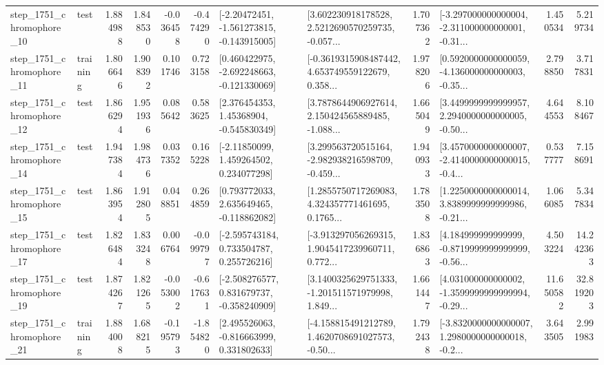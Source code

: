 \begin{tabular}{llrrrrllrlrr}
 step\_1751\_chromophore\_10 &      test &      1.884988 &    1.848530 &     -0.036458 & -0.474290 &   [-2.20472451, -1.561273815, -0.143915005] &  [3.602230918178528, 2.5212690570259735, -0.057... &       1.707362 &  [-3.297000000000004, -2.311000000000001, -0.31... &            1.450534 &          5.219734 \\
 step\_1751\_chromophore\_11 &  training &      1.806646 &    1.908392 &      0.101746 &  0.723158 &   [0.460422975, -2.692248663, -0.121330069] &  [-0.3619315908487442, 4.653749559122679, 0.358... &       1.978206 &  [0.5920000000000059, -4.136000000000003, -0.35... &            2.798850 &          3.717831 \\
 step\_1751\_chromophore\_12 &      test &      1.866294 &    1.951936 &      0.085642 &  0.583625 &     [2.376454353, 1.45368904, -0.545830349] &  [3.7878644906927614, 2.150424565889485, -1.088... &       1.665049 &  [3.4499999999999957, 2.2940000000000005, -0.50... &            4.644553 &          8.108467 \\
 step\_1751\_chromophore\_14 &      test &      1.947384 &    1.984736 &      0.037352 &  0.165228 &     [-2.11850099, 1.459264502, 0.234077298] &  [3.299563720515164, -2.982938216598709, -0.459... &       1.940933 &  [3.4570000000000007, -2.4140000000000015, -0.4... &            0.537777 &          7.158691 \\
 step\_1751\_chromophore\_15 &      test &      1.863954 &    1.912805 &      0.048851 &  0.264859 &    [0.793772033, 2.635649465, -0.118862082] &  [1.2855750717269083, 4.324357771461695, 0.1765... &       1.783508 &  [1.2250000000000014, 3.8389999999999986, -0.21... &            1.066085 &          5.347834 \\
 step\_1751\_chromophore\_17 &      test &      1.826484 &    1.833248 &      0.006764 & -0.099797 &    [-2.595743184, 0.733504787, 0.255726216] &  [-3.913297056269315, 1.9045417239960711, 0.772... &       1.836863 &  [4.184999999999999, -0.8719999999999999, -0.56... &            4.503224 &         14.242363 \\
 step\_1751\_chromophore\_19 &      test &      1.874267 &    1.821265 &     -0.053002 & -0.617631 &   [-2.508276577, 0.831679737, -0.358240909] &  [3.1400325629751333, -1.201511571979998, 1.849... &       1.661447 &  [4.031000000000002, -1.3599999999999994, -0.29... &           11.650582 &         32.819203 \\
 step\_1751\_chromophore\_21 &  training &      1.884008 &    1.688215 &     -0.195793 & -1.854820 &    [2.495526063, -0.816663999, 0.331802633] &  [-4.158815491212789, 1.4620708691027573, -0.50... &       1.792438 &  [-3.8320000000000007, 1.2980000000000018, -0.2... &            3.643505 &          2.991983 \\

\end{tabular}
